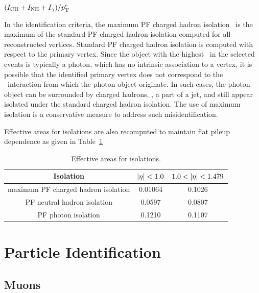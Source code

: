 $(I_{\text{CH}} + I_{\text{NH}} + I_{\gamma}) / p_{\mathrm{T}}^{{e}}$

In the identification criteria, the maximum PF charged hadron isolation \ICHmax\ is the maximum of the standard PF charged hadron isolation computed for all reconstructed vertices. 
Standard PF charged hadron isolation is computed with respect to the primary vertex. 
Since the object with the highest \pt\ in the selected events is typically a photon, which has no intrinsic association to a vertex, it is possible that the identified primary vertex does not correspond to the \Pp\Pp\ interaction from which the photon object originate. 
In such cases, the photon object can be surrounded by charged hadrons, \ie, a part of a jet, and still appear isolated under the standard charged hadron isolation. 
The use of maximum isolation is a conservative measure to address such misidentification.

Effective areas for isolations are also recomputed to maintain flat pileup dependence as given in Table~\ref{tab:ea}
%
\begin{table}[htbp]
  \begin{center}
    \caption{Effective areas for isolations.} 
    \label{tab:ea}
    \begin{tabular}{|c|c|c|}
      \hline
      Isolation & $\lvert \eta \rvert < 1.0$ & $1.0 < \lvert \eta \rvert < 1.479$  \\
      \hline
      maximum PF charged hadron isolation & 0.01064& 0.1026 \\
      PF neutral hadron isolation & 0.0597 & 0.0807 \\
      PF photon isolation & 0.1210 & 0.1107 \\
      \hline
    \end{tabular}
  \end{center}
\end{table}

\section{Particle Identification}
\label{sec:pf_cands}

\subsection{Muons}
\label{sec:pf_muons}

